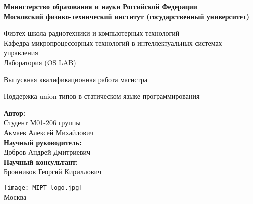 \begin{center}
    \large\textbf{Министерство образования и науки Российской Федерации \\
    Московский физико-технический институт (государственный
    университет)} \\
    \vspace{1cm}

    Физтех-школа радиотехники и компьютерных технологий \\

    Кафедра микропроцессорных технологий в интеллектуальных системах управления \\
    Лаборатория (OS LAB)\\

    \vspace{3em}

    Выпускная квалификационная работа магистра
\end{center}

\begin{center}
    \vspace{\fill}
    \LARGE{Поддержка union типов в статическом языке программирования}

    \vspace{\fill}
\end{center}


\begin{flushright}
    \textbf{Автор:} \\
    Студент М01-206 группы \\
    Акмаев Алексей Михайлович \\
    \vspace{2em}
    \textbf{Научный руководитель:} \\
    Добров Андрей Дмитриевич  \\
    \vspace{2em}
    \textbf{Научный консультант:} \\
    Бронников Георгий Кириллович \\
\end{flushright}

\vspace{7em}

\begin{center}
    \texttt{[image: MIPT\_logo.jpg]}\\
    Москва \the\year{}
\end{center}

\thispagestyle{empty}

\newpage
\setcounter{page}{2}
\fancyfoot[c]{\thepage}
\fancyhead[R]{}